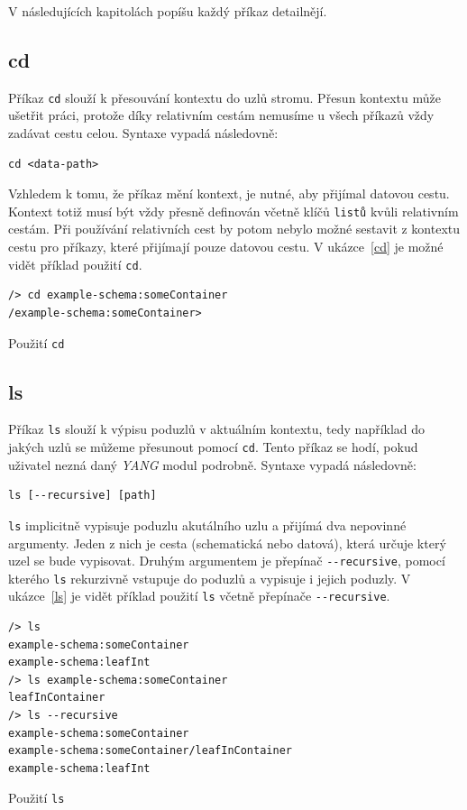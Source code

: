 \documentclass[thesis=B,czech,hidelinks]{FITthesis}[2019/03/06]
\begin{document}
V následujících kapitolách popíšu každý příkaz detailnějí.

\subsection{cd}
Příkaz \texttt{cd} slouží k přesouvání kontextu do uzlů stromu. Přesun kontextu může ušetřit práci, protože díky relativním cestám nemusíme u všech příkazů vždy zadávat cestu celou. Syntaxe vypadá následovně:
\begin{verbatim}
cd <data-path>
\end{verbatim}
Vzhledem k tomu, že příkaz mění kontext, je nutné, aby přijímal datovou cestu. Kontext totiž musí být vždy přesně definován včetně klíčů \texttt{listů} kvůli relativním cestám. Při používání relativních cest by potom nebylo možné sestavit z kontextu cestu pro příkazy, které přijímají pouze datovou cestu. V ukázce~\ref{cd} je možné vidět příklad použití \texttt{cd}.

\begin{listing}
\begin{verbatim}
/> cd example-schema:someContainer
/example-schema:someContainer>
\end{verbatim}
\caption{Použití \texttt{cd}}\label{cd}
\end{listing}

\subsection{ls}
Příkaz \texttt{ls} slouží k výpisu poduzlů v aktuálním kontextu, tedy například do jakých uzlů se můžeme přesunout pomocí \texttt{cd}. Tento příkaz se hodí, pokud uživatel nezná daný \textit{YANG} modul podrobně. Syntaxe vypadá následovně:
\begin{verbatim}
ls [--recursive] [path]
\end{verbatim}
\texttt{ls} implicitně vypisuje poduzlu akutálního uzlu a přijímá dva nepovinné argumenty. Jeden z nich je cesta (schematická nebo datová), která určuje který uzel se bude vypisovat. Druhým argumentem je přepínač \verb¨--recursive¨, pomocí kterého \texttt{ls} rekurzivně vstupuje do poduzlů a vypisuje i jejich poduzly. V ukázce~\ref{ls} je vidět příklad použití \texttt{ls} včetně přepínače \verb¨--recursive¨.

\begin{listing}
\begin{verbatim}
/> ls
example-schema:someContainer
example-schema:leafInt
/> ls example-schema:someContainer
leafInContainer
/> ls --recursive
example-schema:someContainer
example-schema:someContainer/leafInContainer
example-schema:leafInt
\end{verbatim}
\caption{Použití \texttt{ls}}\label{ls}
\end{listing}
\end{document}

